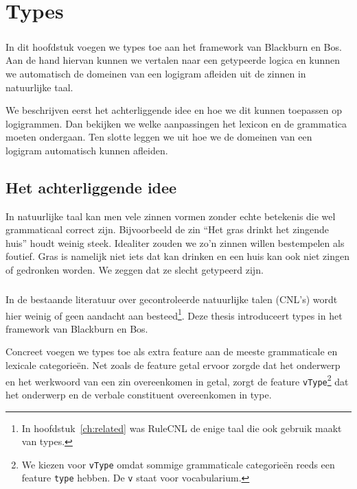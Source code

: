 \chapter{Types}
\label{ch:types}

\paragraph{} In dit hoofdstuk voegen we types toe aan het framework van Blackburn en Bos. Aan de hand hiervan kunnen we vertalen naar een getypeerde logica en kunnen we automatisch de domeinen van een logigram afleiden uit de zinnen in natuurlijke taal.

We beschrijven eerst het achterliggende idee en hoe we dit kunnen toepassen op logigrammen. Dan bekijken we welke aanpassingen het lexicon en de grammatica moeten ondergaan. Ten slotte leggen we uit hoe we de domeinen van een logigram automatisch kunnen afleiden. 

\section{Het achterliggende idee}
In natuurlijke taal kan men vele zinnen vormen zonder echte betekenis die wel grammaticaal correct zijn. Bijvoorbeeld de zin ``Het gras drinkt het zingende huis'' houdt weinig steek. Idealiter zouden we zo'n zinnen willen bestempelen als foutief. Gras is namelijk niet iets dat kan drinken en een huis kan ook niet zingen of gedronken worden. We zeggen dat ze slecht getypeerd zijn.

\paragraph{} In de bestaande literatuur over gecontroleerde natuurlijke talen (CNL's) wordt hier weinig of geen aandacht aan besteed\footnote{In hoofdstuk~\ref{ch:related} was RuleCNL de enige taal die ook gebruik maakt van types.}. Deze thesis introduceert types in het framework van Blackburn en Bos. 

Concreet voegen we types toe als extra feature aan de meeste grammaticale en lexicale categorieën. Net zoals de feature getal ervoor zorgde dat het onderwerp en het werkwoord van een zin overeenkomen in getal, zorgt de feature \texttt{vType}\footnote{We kiezen voor \texttt{vType} omdat sommige grammaticale categorieën reeds een feature \texttt{type} hebben. De \texttt{v} staat voor vocabularium.} dat het onderwerp en de verbale constituent overeenkomen in type.

